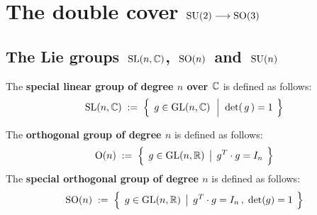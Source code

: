 

\chapter{The double cover $\textnormal{SU}(2) \longrightarrow \textnormal{SO}(3)$}

\setcounter{theorem}{0}
\setcounter{equation}{0}


\renewcommand{\theenumi}{\roman{enumi}}
\renewcommand{\labelenumi}{\textnormal{(\theenumi)}$\;\;$}


\section{The Lie groups  \,$\textnormal{SL}(n,\mathbb{C})$,\, $\textnormal{SO}(n)$\, and \,$\textnormal{SU}(n)$}


\vskip 0.3cm
\begin{definition}
\mbox{}
\vskip 0.1cm
\noindent
The \textbf{special linear group of degree $n$ over $\mathbb{C}$} is defined as follows:
\begin{equation*}
\SL(n,\C)
\; := \;
	\left\{\;\,
		g \overset{{\color{white}.}}{\in} \textnormal{GL}(n,\C)
		\;\,\left\vert\;\;
			\det(\,g\,) \overset{{\color{white}1}}{=} 1
			\right.
		\;\right\}
\end{equation*}
\end{definition}

\vskip 0.5cm
\begin{definition}
\mbox{}
\vskip 0.1cm
\noindent
The \textbf{orthogonal group of degree $n$} is defined as follows:
\begin{equation*}
\textnormal{O}(n)
\; := \;
	\left\{\;\,
		g \overset{{\color{white}.}}{\in} \textnormal{GL}(n,\Re)
		\;\left\vert\;\,
			g^{T} \cdot g = I_{n}
			\right.
		\;\right\}
\end{equation*}
The \textbf{special orthogonal group of degree $n$} is defined as follows:
\begin{equation*}
\textnormal{SO}(n)
\; := \;
	\left\{\;\,
		g \overset{{\color{white}.}}{\in} \textnormal{GL}(n,\Re)
		\;\left\vert\;\,
			g^{T} \cdot g = I_{n}\,,
			\;
			\textnormal{det}(g) = 1
			\right.
		\;\right\}
\end{equation*}
\end{definition}

